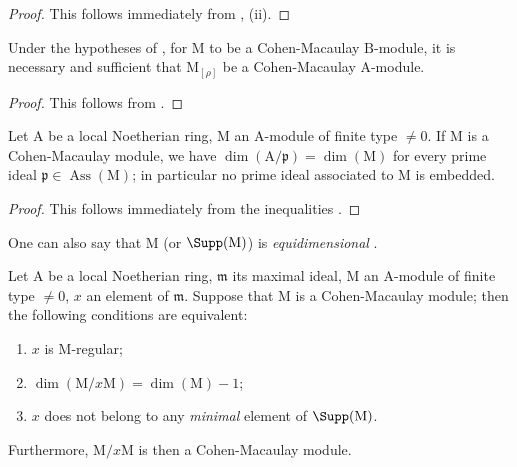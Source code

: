 \begin{proof}
This follows immediately from , (ii).
\end{proof}

\begin{proposition}[16.5.3]
\label{0.16.5.3}
Under the hypotheses of , for $\mathrm{M}$ to be a Cohen-Macaulay $\mathrm{B}$-module, it is necessary and sufficient that $\mathrm{M}_{[\rho]}$ be a Cohen-Macaulay $\mathrm{A}$-module.
\end{proposition}

\begin{proof}
This follows from .
\end{proof}

\begin{proposition}[16.5.4]
\label{0.16.5.4}
Let $\mathrm{A}$ be a local Noetherian ring, $\mathrm{M}$ an $\mathrm{A}$-module of finite type $\neq 0$.
If $\mathrm{M}$ is a Cohen-Macaulay module, we have $\dim(\mathrm{A}/\mathfrak{p})=\dim(\mathrm{M})$ for every prime ideal $\mathfrak{p}\in\operatorname{Ass}(\mathrm{M})$; in particular no prime ideal associated to $\mathrm{M}$ is embedded.
\end{proposition}

\begin{proof}
This follows immediately from the inequalities .
\end{proof}

One can also say that $\mathrm{M}$ (or $\Supp(\mathrm{M})$) is \emph{equidimensional} .


\begin{proposition}[16.5.5]
\label{0.16.5.5}
Let $\mathrm{A}$ be a local Noetherian ring, $\mathfrak{m}$ its maximal ideal, $\mathrm{M}$ an $\mathrm{A}$-module of finite type $\neq 0$, $x$ an element of $\mathfrak{m}$.
Suppose that $\mathrm{M}$ is a Cohen-Macaulay module; then the following conditions are equivalent:
\begin{enumerate}
  \item[a)] $x$ is $\mathrm{M}$-regular;
  \item[b)] $\dim(\mathrm{M}/x\mathrm{M})=\dim(\mathrm{M})-1$;
  \item[c)] $x$ does not belong to any \emph{minimal} element of $\Supp(\mathrm{M})$.
\end{enumerate}
Furthermore, $\mathrm{M}/x\mathrm{M}$ is then a Cohen-Macaulay module.
\end{proposition}


